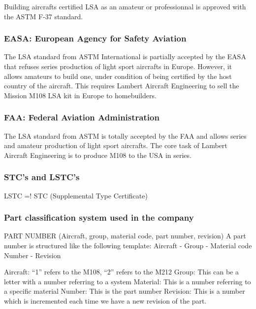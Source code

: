 \documentclass[11pt,a4paper]{article}
\begin{document}
\bigskip

Building aircrafts certified LSA as an amateur or professionnal is approved with the ASTM F-37 standard.

\subsubsection{EASA: European Agency for Safety Aviation}
The LSA standard from ASTM International is partially accepted by the EASA that refuses series production of light sport aircrafts in Europe. However, it allows amateurs to build one, under condition of being certified by the host country of the aircraft. This requires Lambert Aircraft Engineering to sell the Mission M108 LSA kit in Europe to homebuilders.

\subsubsection{FAA: Federal Aviation Administration}
The LSA standard from ASTM is totally accepted by the FAA and allows series and amateur production of light sport aircrafts. The core task of Lambert Aircraft Engineering is to produce M108 to the USA in series.

\subsubsection{STC's and LSTC's}
LSTC =! STC (Supplemental Type Certificate)

\subsubsection{Part classification system used in the company}
PART NUMBER (Aircraft, group, material code, part number, revision)
A part number is structured like the following template:
Aircraft - Group - Material code Number - Revision

Aircraft: ``1'' refers to the M108, ``2'' refers to the M212
Group: This can be a letter with a number referring to a system
Material: This is a number referring to a specific material
Number: This is the part number
Revision: This is a number which is incremented each time we have a new revision of the part.

\end{document}
